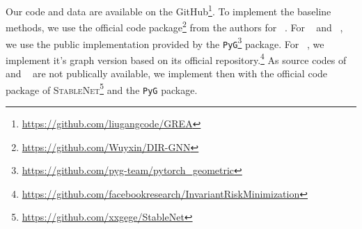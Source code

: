 \documentclass[sigconf]{acmart}
\begin{document}
Our code and data are available on the GitHub\footnote{\url{https://github.com/liugangcode/GREA}}. To implement the baseline methods, we use the official code package\footnote{\url{https://github.com/Wuyxin/DIR-GNN}} from the authors for \dir~\citep{wu2022discovering}. For \unets~\cite{gao2021graph} and \selfattn~\cite{lee2019self}, we use the public implementation provided by the \verb+PyG+\footnote{\url{https://github.com/pyg-team/pytorch_geometric}} package. For \irm~\citep{arjovsky2019invariant}, we implement it's graph version based on its official repository.\footnote{\url{https://github.com/facebookresearch/InvariantRiskMinimization}}
As source codes of \oodgnn~\cite{li2021ood} and \stablegnn~\cite{fan2021generalizing} are not publically available, we implement then with the official code package of \textsc{StableNet}\footnote{\url{https://github.com/xxgege/StableNet}} and the \verb+PyG+ package. 
\end{document}
